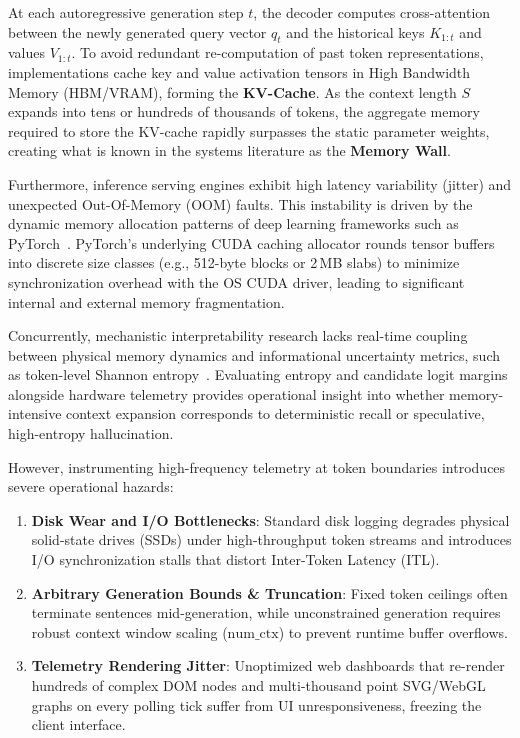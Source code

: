 \documentclass[10pt,twocolumn]{article}
\begin{document}
At each autoregressive generation step $t$, the decoder computes cross-attention between the newly generated query vector $q_t$ and the historical keys $K_{1:t}$ and values $V_{1:t}$. To avoid redundant re-computation of past token representations, implementations cache key and value activation tensors in High Bandwidth Memory (HBM/VRAM), forming the \textbf{KV-Cache}. As the context length $S$ expands into tens or hundreds of thousands of tokens, the aggregate memory required to store the KV-cache rapidly surpasses the static parameter weights, creating what is known in the systems literature as the \textbf{Memory Wall}.

Furthermore, inference serving engines exhibit high latency variability (jitter) and unexpected Out-Of-Memory (OOM) faults. This instability is driven by the dynamic memory allocation patterns of deep learning frameworks such as PyTorch~\cite{paszke2019pytorch}. PyTorch's underlying CUDA caching allocator rounds tensor buffers into discrete size classes (e.g., 512-byte blocks or 2\,MB slabs) to minimize synchronization overhead with the OS CUDA driver, leading to significant internal and external memory fragmentation.

Concurrently, mechanistic interpretability research lacks real-time coupling between physical memory dynamics and informational uncertainty metrics, such as token-level Shannon entropy~\cite{shannon1948mathematical}. Evaluating entropy and candidate logit margins alongside hardware telemetry provides operational insight into whether memory-intensive context expansion corresponds to deterministic recall or speculative, high-entropy hallucination.

However, instrumenting high-frequency telemetry at token boundaries introduces severe operational hazards:
\begin{enumerate}
    \item \textbf{Disk Wear and I/O Bottlenecks}: Standard disk logging degrades physical solid-state drives (SSDs) under high-throughput token streams and introduces I/O synchronization stalls that distort Inter-Token Latency (ITL).
    \item \textbf{Arbitrary Generation Bounds \& Truncation}: Fixed token ceilings often terminate sentences mid-generation, while unconstrained generation requires robust context window scaling ($\mathrm{num\_ctx}$) to prevent runtime buffer overflows.
    \item \textbf{Telemetry Rendering Jitter}: Unoptimized web dashboards that re-render hundreds of complex DOM nodes and multi-thousand point SVG/WebGL graphs on every polling tick suffer from UI unresponsiveness, freezing the client interface.
\end{enumerate}
\end{document}
